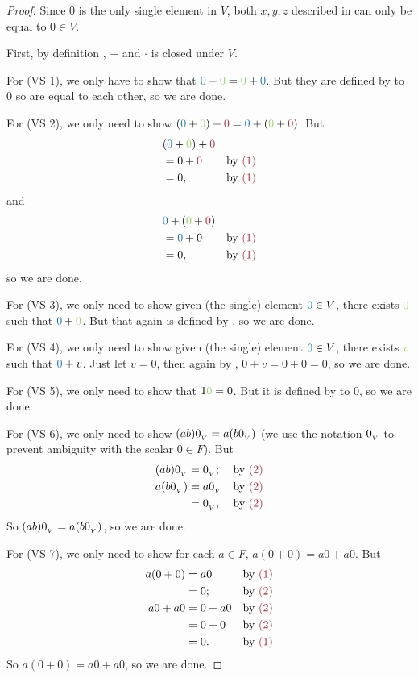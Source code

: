 \begin{proof}
Since \(0\) is the only single element in \(V\), both \(x, y, z\) described in  can only be equal to \(0 \in V\).

First, by definition , \(+\) and \(\cdot\) is closed under \(V\).

For (VS 1), we only have to show that \(\BLUE{0} + \GREEN{0} = \GREEN{0} + \BLUE{0}\).
But they are defined by  to \(0\) so are equal to each other, so we are done.

For (VS 2), we only need to show \((\BLUE{0} + \GREEN{0}) + \MAROON{0} = \BLUE{0} + (\GREEN{0} + \MAROON{0})\).
But
\begin{align*}
    & (\BLUE{0} + \GREEN{0}) + \MAROON{0} \\
    & = 0 + \MAROON{0} & \text{by \MAROON{(1)}} \\
    & = 0, & \text{by \MAROON{(1)}}
\end{align*}
and
\begin{align*}
    & \BLUE{0} + (\GREEN{0} + \MAROON{0}) \\
    & = \BLUE{0} + 0 & \text{by \MAROON{(1)}} \\
    & = 0, & \text{by \MAROON{(1)}}
\end{align*}
so we are done.

For (VS 3), we only need to show given (the single) element \(\BLUE{0} \in V\), there exists \(\GREEN{0}\) such that \(\BLUE{0} + \GREEN{0}\).
But that again is defined by , so we are done.

For (VS 4), we only need to show given (the single) element \(\BLUE{0} \in V\), there exists \(\GREEN{v}\) such that \(\BLUE{0} + v\).
Just let \(v = 0\), then again by , \(0 + v = 0 + 0 = 0\), so we are done.

For (VS 5), we only need to show that \(1 \GREEN{0} = 0\).
But it is defined by  to \(0\), so we are done.

For (VS 6), we only need to show \((ab)0_{_V} = a(b0_{_V})\) (we use the notation \(0_{_V}\) to prevent ambiguity with the scalar \(0 \in F\)).
But
\begin{align*}
    (ab)\OV & = \OV; & \text{by \MAROON{(2)}} \\
    a(b\OV) & = a\OV & \text{by \MAROON{(2)}} \\
            & = \OV, & \text{by \MAROON{(2)}}
\end{align*}
So \((ab)0_{_V} = a(b0_{_V})\), so we are done.

For (VS 7), we only need to show for each \(a \in F\), \(a(0 + 0) = a0 + a0\).
But
\begin{align*}
    a(0 + 0) & = a0 & \text{by \MAROON{(1)}} \\
             & = 0; & \text{by \MAROON{(2)}} \\
     a0 + a0 & = 0 + a0 & \text{by \MAROON{(2)}} \\
             & = 0 + 0 & \text{by \MAROON{(2)}} \\
             & = 0. & \text{by \MAROON{(1)}}
\end{align*}
So \(a(0 + 0) = a0 + a0\), so we are done.


\end{proof}
